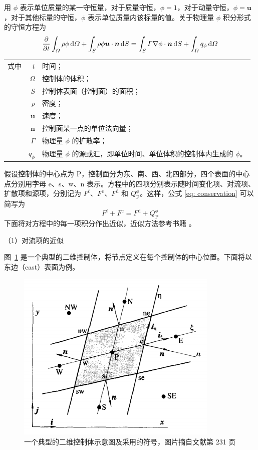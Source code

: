 用 $\phi$ 表示单位质量的某一守恒量，对于质量守恒，$\phi=1$，对于动量守恒，$\phi=\bm{u}$，对于其他标量的守恒，$\phi$ 表示单位质量内该标量的值。关于物理量 $\phi$ 积分形式的守恒方程为
\begin{equation}\label{eq: conservation}
	\frac{\partial}{\partial t}\int_{\varOmega}\rho\phi\,\mathrm{d}\varOmega +
	\int_S\rho\phi\bm{u}\cdot\bm{n}\,\mathrm{d} S =
	\int_S\varGamma\nabla\phi\cdot\bm{n}\,\mathrm{d} S +
	\int_{\varOmega}q_{\phi}\,\mathrm{d}\varOmega
\end{equation}
\begin{tabularx}{\textwidth}{@{}l@{\quad}r@{——}X@{}}
	式中 & $t$ & 时间；\\
		& $\varOmega$ & 控制体的体积；\\
		& $S$ & 控制体表面（控制面）的面积；\\
		& $\rho$ & 密度；\\
		& $\bm{u}$ & 速度；\\
		& $\bm{n}$ & 控制面某一点的单位法向量；\\
		& $\varGamma$ & 物理量 $\phi$ 的扩散率；\\
		& $q_{\phi}$ & 物理量 $\phi$ 的源或汇，即单位时间、单位体积的控制体内生成的 $\phi$。
\end{tabularx}\vspace{3.15bp}
假设控制体的中心点为 P，控制面分为东、南、西、北四部分，四个表面的中心点分别用字母 e、s、w、n 表示。方程中的四项分别表示随时间变化项、对流项、扩散项和源项，分别记为 $F^t$、$F^{\mathrm{c}}$、$F^{\mathrm{d}}$ 和 $Q_{\mathrm{P}}^{\phi}$。这样，公式 \eqref{eq: conservation} 可以简写为
\begin{equation}
	F^t + F^{\mathrm{c}} = F^{\mathrm{d}} + Q_{\mathrm{P}}^{\phi}
\end{equation}
下面将对方程中的每一项积分作出近似，近似方法参考书籍 。

（1）对流项的近似

图~\ref{fig: CV} 是一个典型的二维控制体，将节点定义在每个控制体的中心位置。下面将以东边（east）表面为例。

\begin{figure}
	\centering
	\includegraphics[scale=.6]{figs/CV}
	\caption{一个典型的二维控制体示意图及采用的符号，图片摘自文献第 231 页}
	\label{fig: CV}
\end{figure}

